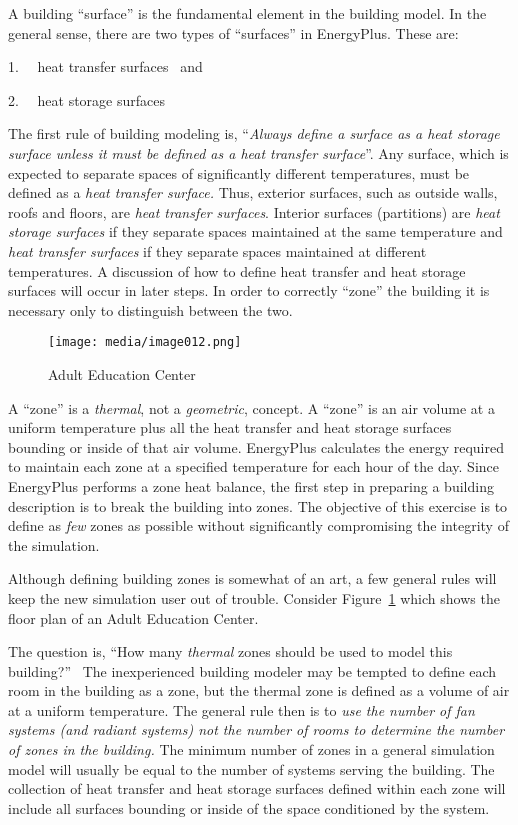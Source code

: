 A building ``surface'' is the fundamental element in the building model. In the general sense, there are two types of ``surfaces'' in EnergyPlus. These are:

1.~~ heat transfer surfaces~ and

2.~~ heat storage surfaces

The first rule of building modeling is, ``\emph{Always define a surface as a heat storage surface unless it must be defined as a heat transfer surface}''. Any surface, which is expected to separate spaces of significantly different temperatures, must be defined as a \emph{heat transfer surface.} Thus, exterior surfaces, such as outside walls, roofs and floors, are \emph{heat transfer surfaces}. Interior surfaces (partitions) are \emph{heat storage surfaces} if they separate spaces maintained at the same temperature and \emph{heat transfer surfaces} if they separate spaces maintained at different temperatures. A discussion of how to define heat transfer and heat storage surfaces will occur in later steps. In order to correctly ``zone'' the building it is necessary only to distinguish between the two.

\begin{figure}[hbtp] %
\centering
\texttt{[image: media/image012.png]}
\caption{Adult Education Center \protect \label{fig:adult-education-center}}
\end{figure}

A ``zone'' is a \emph{thermal}, not a \emph{geometric}, concept. A ``zone'' is an air volume at a uniform temperature plus all the heat transfer and heat storage surfaces bounding or inside of that air volume. EnergyPlus calculates the energy required to maintain each zone at a specified temperature for each hour of the day. Since EnergyPlus performs a zone heat balance, the first step in preparing a building description is to break the building into zones. The objective of this exercise is to define as \emph{few} zones as possible without significantly compromising the integrity of the simulation.

Although defining building zones is somewhat of an art, a few general rules will keep the new simulation user out of trouble. Consider Figure~\ref{fig:adult-education-center} which shows the floor plan of an Adult Education Center.

The question is, ``How many \emph{thermal} zones should be used to model this building?''~ The inexperienced building modeler may be tempted to define each room in the building as a zone, but the thermal zone is defined as a volume of air at a uniform temperature. The general rule then is to \emph{use the number of fan systems (and radiant systems) not the number of rooms to determine the number of zones in the building.} The minimum number of zones in a general simulation model will usually be equal to the number of systems serving the building. The collection of heat transfer and heat storage surfaces defined within each zone will include all surfaces bounding or inside of the space conditioned by the system.

